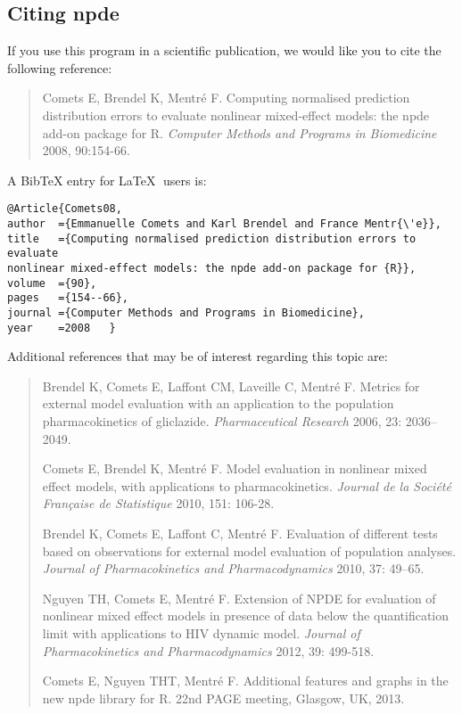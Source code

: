 \documentclass[12pt,a4paper]{article}
\begin{document}
\subsection{Citing {\sf npde}}

\hskip 18pt If you use this program in a scientific publication, we would like you to cite the following reference:
\begin{quotation}
\noindent Comets E, Brendel K, Mentré F. Computing normalised prediction distribution errors to evaluate nonlinear mixed-effect models: the npde add-on package for R. {\it Computer Methods and Programs in Biomedicine} 2008, 90:154-66.
\end{quotation}

A BibTeX entry for \LaTeX$\;$ users is:
\begin{verbatim}
@Article{Comets08,
author	={Emmanuelle Comets and Karl Brendel and France Mentr{\'e}},
title	={Computing normalised prediction distribution errors to evaluate
nonlinear mixed-effect models: the npde add-on package for {R}},
volume	={90},
pages	={154--66},
journal	={Computer Methods and Programs in Biomedicine},
year	=2008	}
\end{verbatim}

Additional references that may be of interest regarding this topic are:
\begin{quotation}
\noindent Brendel K, Comets E, Laffont CM, Laveille C, Mentr{\'e} F. Metrics for
external model evaluation with an application to the population pharmacokinetics
of gliclazide. {\it Pharmaceutical Research} 2006, 23: 2036--2049.

\noindent Comets E, Brendel K, Mentré F. Model evaluation in nonlinear mixed effect models, with applications to pharmacokinetics. {\it Journal de la Soci{\'e}t{\'e} Fran\c{c}aise de Statistique} 2010, 151: 106-28.

\noindent Brendel K,  Comets E, Laffont C, Mentr{\'e} F. Evaluation of different tests based on observations for external model evaluation of population analyses. {\it Journal of Pharmacokinetics and Pharmacodynamics} 2010, 37: 49--65.

\noindent Nguyen TH, Comets E, Mentré F. Extension of NPDE for evaluation of nonlinear mixed effect models in presence of data below the quantification limit with applications to HIV dynamic model. {\it Journal of Pharmacokinetics and Pharmacodynamics} 2012, 39: 499-518.

\noindent Comets E, Nguyen THT, Mentré F.  Additional features and graphs in the new npde library for R. 22nd PAGE meeting, Glasgow, UK, 2013.
\end{quotation}
\end{document}
